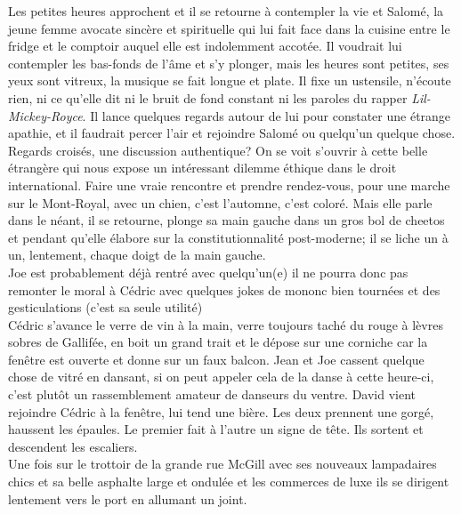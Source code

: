 \documentclass{article}
\begin{document}
Les petites heures approchent et il se retourne à contempler la vie et Salomé,
la jeune femme avocate sincère et spirituelle qui lui fait face dans la cuisine
entre le fridge et le comptoir auquel elle est indolemment accotée. Il voudrait
lui contempler les bas-fonds de l'âme et s'y plonger, mais les heures sont
petites, ses yeux sont vitreux, la musique se fait longue et plate. Il fixe un
ustensile, n'écoute rien, ni ce qu'elle dit ni le bruit de fond constant ni les
paroles du rapper \textit{Lil-Mickey-Royce}. Il lance quelques regards autour de
lui pour constater une étrange apathie, et il faudrait percer l'air et rejoindre
Salomé ou quelqu'un quelque chose. Regards croisés, une discussion authentique?
On se voit s'ouvrir à cette belle étrangère qui nous expose un intéressant
dilemme éthique dans le droit international. Faire une vraie rencontre et
prendre rendez-vous, pour une marche sur le Mont-Royal, avec un chien, c'est
l'automne, c'est coloré. Mais elle parle dans le néant, il se retourne, plonge
sa main gauche dans un gros bol de cheetos et pendant qu'elle élabore sur la
constitutionnalité post-moderne; il se liche un à un, lentement, chaque doigt de
la main gauche. \\


Joe est probablement déjà rentré avec quelqu'un(e) il ne pourra donc pas
remonter le moral à Cédric avec quelques jokes de mononc bien tournées et des
gesticulations (c'est sa seule utilité)\\

Cédric s'avance le verre de vin à la main, verre toujours
taché du rouge à lèvres sobres de Gallifée, en boit un grand trait et le dépose sur
une corniche car la fenêtre est ouverte et donne sur un faux balcon. Jean et Joe
cassent quelque chose de vitré en dansant, si on peut appeler cela de
la danse à cette heure-ci, c'est plutôt un rassemblement amateur de danseurs
du ventre. David vient rejoindre Cédric à la fenêtre, lui tend une bière.
Les deux prennent une gorgé, haussent les épaules. Le premier fait à l'autre un
signe de tête. Ils sortent et descendent les escaliers.\\

Une fois sur le trottoir de la grande rue McGill avec ses nouveaux lampadaires
chics et sa belle asphalte large et ondulée et les commerces de luxe ils se
dirigent lentement vers le port en allumant un joint.\\
\end{document}
